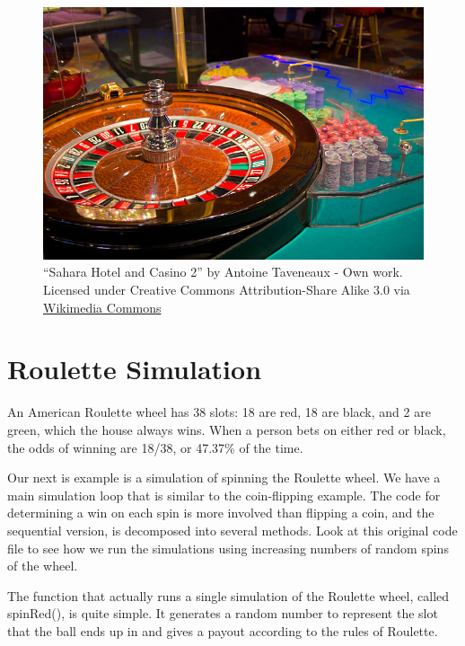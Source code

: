 \documentclass[letterpaper,10pt,openany,oneside]{sphinxmanual}
\begin{document}
\begin{figure}[htbp]
\centering
\capstart

\includegraphics{640px-Sahara_Hotel_and_Casino_2.jpg}
\caption{``Sahara Hotel and Casino 2'' by Antoine Taveneaux - Own work. Licensed under Creative Commons
Attribution-Share Alike 3.0 via
\href{http://commons.wikimedia.org/wiki/File:Sahara\_Hotel\_and\_Casino\_2.jpg\#mediaviewer/File:Sahara\_Hotel\_and\_Casino\_2.jpg}{Wikimedia Commons}}\end{figure}


\chapter{Roulette Simulation}
\label{RouletteSimulation/RouletteSimulation::doc}\label{RouletteSimulation/RouletteSimulation:roulette-simulation}
An American Roulette wheel has 38 slots: 18 are red, 18 are black, and 2 are
green, which the house always wins. When a person bets on either red or black,
the odds of winning are 18/38, or 47.37\% of the time.

Our next is example is a simulation of spinning the Roulette wheel. We have a
main simulation loop that is similar to the coin-flipping example. The code
for determining a win on each spin is more involved than flipping a coin, and
the sequential version,
is decomposed into several methods. Look at this original code file to see how
we run the simulations using increasing numbers of random spins of the wheel.

The function that actually runs a single simulation of the Roulette wheel, called spinRed(),  is quite
simple. It generates a random number to represent the slot that the ball
ends up in and gives a payout according to the rules of Roulette.
\end{document}

